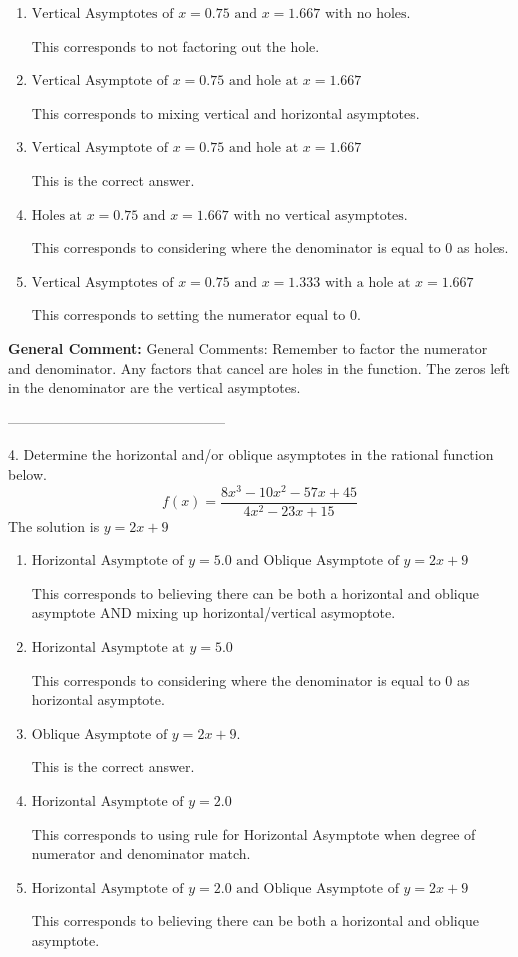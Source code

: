 \documentclass{extbook}[14pt]
\begin{document}
\begin{enumerate}[label=\Alph*.] 
\item $ \text{Vertical Asymptotes of } x = 0.75 \text{ and } x = 1.667 \text{ with no holes.} $ 

 This corresponds to not factoring out the hole. 
\item $ \text{Vertical Asymptote of } x = 0.75 \text{ and hole at } x = 1.667 $ 

 This corresponds to mixing vertical and horizontal asymptotes. 
\item $ \text{Vertical Asymptote of } x = 0.75 \text{ and hole at } x = 1.667 $ 

 This is the correct answer. 
\item $ \text{Holes at } x = 0.75 \text{ and } x = 1.667 \text{ with no vertical asymptotes.} $ 

 This corresponds to considering where the denominator is equal to 0 as holes. 
\item $ \text{Vertical Asymptotes of } x = 0.75 \text{ and } x = 1.333 \text{ with a hole at } x = 1.667 $ 

 This corresponds to setting the numerator equal to 0. 
\end{enumerate} 
 
\textbf{General Comment:} General Comments: Remember to factor the numerator and denominator. Any factors that cancel are holes in the function. The zeros left in the denominator are the vertical asymptotes. 

-----------------------------------------------

4. Determine the horizontal and/or oblique asymptotes in the rational function below.
\[ f(x) = \frac{8x^{3} -10 x^{2} -57 x + 45}{4x^{2} -23 x + 15} \] 
The solution is $ y = 2x + 9 $ 

\begin{enumerate}[label=\Alph*.] 
\item $ \text{Horizontal Asymptote of } y = 5.0 \text{ and Oblique Asymptote of } y = 2x + 9 $ 

 This corresponds to believing there can be both a horizontal and oblique asymptote AND mixing up horizontal/vertical asymoptote. 
\item $ \text{Horizontal Asymptote at } y = 5.0 $ 

 This corresponds to considering where the denominator is equal to 0 as horizontal asymptote. 
\item $ \text{Oblique Asymptote of } y = 2x + 9. $ 

 This is the correct answer. 
\item $ \text{Horizontal Asymptote of } y = 2.0  $ 

 This corresponds to using rule for Horizontal Asymptote when degree of numerator and denominator match. 
\item $ \text{Horizontal Asymptote of } y = 2.0 \text{ and Oblique Asymptote of } y = 2x + 9 $ 

 This corresponds to believing there can be both a horizontal and oblique asymptote. 
\end{enumerate} 
 
\end{document}
